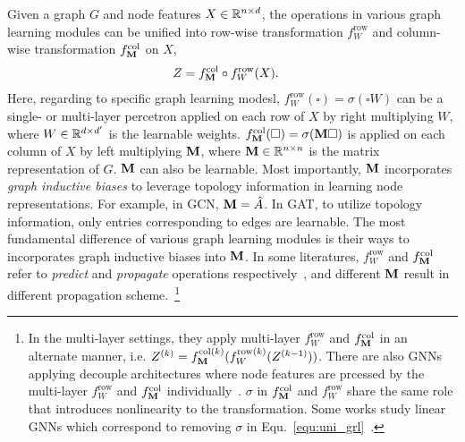 \documentclass{article} %
\begin{document}
Given a graph $G$ and node features $X\in{\mathbb{R}}^{n\times d}$, the operations in various graph learning modules can be unified into row-wise transformation $f_W^{\mathrm{row}}$ and column-wise transformation $f_{{\mathbf{M}}}^{\mathrm{col}}$ on $X$,
\begin{equation}
	\label{equ:uni_grl}
	\begin{aligned}
		Z&=f_{{\mathbf{M}}}^{\mathrm{col}}\circ f_W^{\mathrm{row}}(X).
	\end{aligned}
\end{equation}
Here, regarding to specific graph learning modesl, $f_W^{\mathrm{row}}(\square)=\sigma(\square W)$ can be a single- or multi-layer percetron applied on each row of $X$ by right multiplying $W$, where $W\in{\mathbb{R}}^{d\times d^{\prime}}$ is the learnable weights.
$f_{{\mathbf{M}}}^{\mathrm{col}}(\square)=\sigma({\mathbf{M}}\square)$ is applied on each column of $X$ by left multiplying ${\mathbf{M}}$, where ${\mathbf{M}}\in{\mathbb{R}}^{n\times n}$ is the matrix representation of $G$.
${\mathbf{M}}$ can also be learnable.
Most importantly, ${\mathbf{M}}$ incorporates \emph{graph inductive biases} to leverage topology information in learning node representations.
For example, in GCN, ${\mathbf{M}}=\hat A$.
In GAT, to utilize topology information, only entries corresponding to edges are learnable.
The most fundamental difference of various graph learning modules is their ways to incorporates graph inductive biases into ${\mathbf{M}}$.
In some literatures, $f_W^{\mathrm{row}}$ and $f_{{\mathbf{M}}}^{\mathrm{col}}$ refer to \emph{predict} and \emph{propagate} operations respectively~\citep{klicpera_predict_2019}, and different ${\mathbf{M}}$ result in different propagation scheme.~\footnote{
In the multi-layer settings, they apply multi-layer $f_W^{\mathrm{row}}$ and $f_{{\mathbf{M}}}^{\mathrm{col}}$ in an alternate manner, i.e. $Z^{(k)}=f_{{\mathbf{M}}}^{\mathrm{col}(k)}(f_W^{\mathrm{row}(k)}(Z^{(k-1)}))$.
There are also GNNs applying decouple architectures where node features are prcessed by the multi-layer $f_W^{\mathrm{row}}$ and $f_{{\mathbf{M}}}^{\mathrm{col}}$ individually~\citep{klicpera_predict_2019,pmlr-v97-wu19e,klicpera_predict_2019,liu2020towards,zhu2020simple,zhang2021litegem}.
$\sigma$ in $f_{{\mathbf{M}}}^{\mathrm{col}}$ and $f_W^{\mathrm{row}}$ share the same role that introduces nonlinearity to the transformation.
Some works study linear GNNs which correspond to removing $\sigma$ in Equ.~\ref{equ:uni_grl}~\citep{pmlr-v97-wu19e,xu2021optimization,JacobiConv,liu2021eignn,liu2022mgnni}.
}
\end{document}
